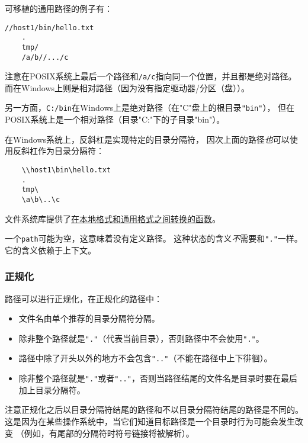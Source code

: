 可移植的通用路径的例子有：
\begin{lstlisting}[commentstyle=\color{black}]
    //host1/bin/hello.txt
    .
    tmp/
    /a/b//.../c
\end{lstlisting}
注意在POSIX系统上最后一个路径和\texttt{/a/c}指向同一个位置，并且都是绝对路径。
而在Windows上则是相对路径（因为没有指定驱动器/分区（盘））。

另一方面，\texttt{C:/bin}在Windows上是绝对路径（在"C"盘上的根目录\texttt{"bin"}），
但在POSIX系统上是一个相对路径（目录"C:"下的子目录"bin"）。

在Windows系统上，反斜杠是实现特定的目录分隔符，
因次上面的路径\emph{也}可以使用反斜杠作为目录分隔符：
\begin{lstlisting}
    \\host1\bin\hello.txt
    .
    tmp\
    \a\b\..\c
\end{lstlisting}
文件系统库提供了\hyperref[ch20.3.4]{在本地格式和通用格式之间转换的函数}。

一个\texttt{path}可能为空，这意味着没有定义路径。
这种状态的含义\emph{不}需要和\texttt{"."}一样。它的含义依赖于上下文。

\subsubsection{正规化}
路径可以进行正规化，在正规化的路径中：
\begin{itemize}[leftmargin=*]
    \item 文件名由单个推荐的目录分隔符分隔。
    \item 除非整个路径就是\texttt{"."}（代表当前目录），否则路径中不会使用\texttt{"."}。
    \item 路径中除了开头以外的地方不会包含\texttt{".."}（不能在路径中上下徘徊）。
    \item 除非整个路径就是\texttt{"."}或者\texttt{".."}，否则当路径结尾的文件名是目录时要在最后加上目录分隔符。
\end{itemize}
注意正规化之后以目录分隔符结尾的路径和不以目录分隔符结尾的路径是不同的。
这是因为在某些操作系统中，当它们知道目标路径是一个目录时行为可能会发生改变
（例如，有尾部的分隔符时符号链接将被解析）。

